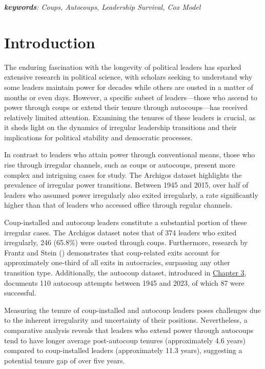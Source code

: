 \documentclass[
  12pt,
]{report}
\begin{document}
\emph{\textbf{keywords}: Coups, Autocoups, Leadership Survival, Cox
Model}

\newpage

\section{Introduction}\label{introduction-3}

The enduring fascination with the longevity of political leaders has
sparked extensive research in political science, with scholars seeking
to understand why some leaders maintain power for decades while others
are ousted in a matter of months or even days. However, a specific
subset of leaders---those who ascend to power through coups or extend
their tenure through autocoups---has received relatively limited
attention. Examining the tenures of these leaders is crucial, as it
sheds light on the dynamics of irregular leadership transitions and
their implications for political stability and democratic processes.

In contrast to leaders who attain power through conventional means,
those who rise through irregular channels, such as coups or autocoups,
present more complex and intriguing cases for study. The Archigos
dataset highlights the prevalence of irregular power transitions.
Between 1945 and 2015, over half of leaders who assumed power
irregularly also exited irregularly, a rate significantly higher than
that of leaders who accessed office through regular channels.

Coup-installed and autocoup leaders constitute a substantial portion of
these irregular cases. The Archigos dataset notes that of 374 leaders
who exited irregularly, 246 (65.8\%) were ousted through coups.
Furthermore, research by Frantz and Stein
() demonstrates that coup-related exits
account for approximately one-third of all exits in autocracies,
surpassing any other transition type. Additionally, the autocoup
dataset, introduced in \hyperref[sec-chapter3]{Chapter 3}, documents 110
autocoup attempts between 1945 and 2023, of which 87 were successful.

Measuring the tenure of coup-installed and autocoup leaders poses
challenges due to the inherent irregularity and uncertainty of their
positions. Nevertheless, a comparative analysis reveals that leaders who
extend power through autocoups tend to have longer average post-autocoup
tenures (approximately 4.6 years) compared to coup-installed leaders
(approximately 11.3 years), suggesting a potential tenure gap of over
five years.
\end{document}
